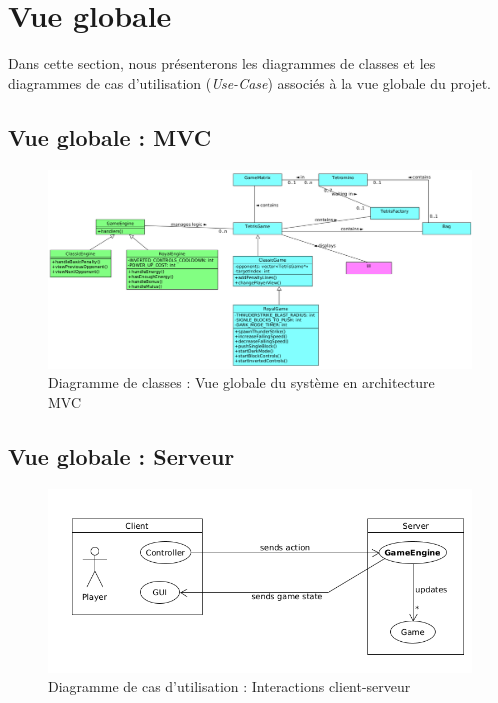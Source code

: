 \documentclass{report}
\begin{document}
\section{Vue globale}

\noindent Dans cette section, nous présenterons les diagrammes de classes et les diagrammes de cas d’utilisation (\textit{Use-Case}) associés à la vue globale du projet.

\subsection{Vue globale : MVC}

\vspace{-1em}

\begin{figure}[H]
    \centering
    \includegraphics[width=\textwidth, keepaspectratio]{src/global.png}
    \caption{Diagramme de classes : Vue globale du système en architecture MVC}
    \label{fig:class_global_mvc}
\end{figure}

\subsection{Vue globale : Serveur}

\vspace{-1em}

\begin{figure}[H]
    \centering
    \includegraphics[width=\textwidth, keepaspectratio]{src/server.png}
    \caption{Diagramme de cas d’utilisation : Interactions client-serveur}
    \label{fig:use_case_server}
\end{figure}
\end{document}
